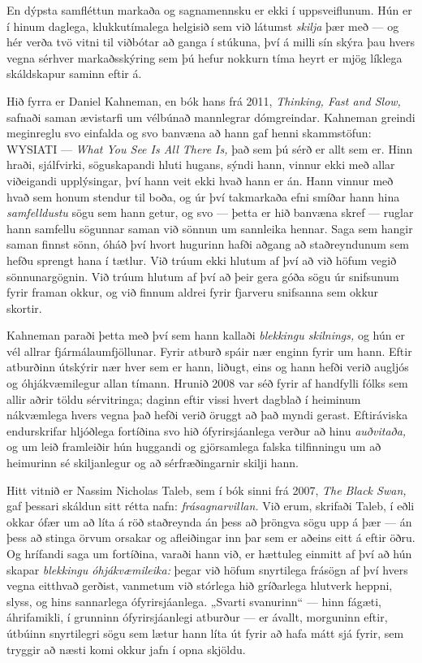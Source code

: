En dýpsta samfléttun markaða og sagnamennsku er ekki í uppsveiflunum. Hún er í hinum daglega, klukkutímalega helgisið sem við látumst \emph{skilja} þær með — og hér verða tvö vitni til viðbótar að ganga í stúkuna, því á milli sín skýra þau hvers vegna sérhver markaðsskýring sem þú hefur nokkurn tíma heyrt er mjög líklega skáldskapur saminn eftir á.

Hið fyrra er Daniel Kahneman, en bók hans frá 2011, \emph{Thinking, Fast and Slow,} safnaði saman ævistarfi um vélbúnað mannlegrar dómgreindar. Kahneman greindi meginreglu svo einfalda og svo banvæna að hann gaf henni skammstöfun: WYSIATI — \emph{What You See Is All There Is,} það sem þú sérð er allt sem er. Hinn hraði, sjálfvirki, söguskapandi hluti hugans, sýndi hann, vinnur ekki með allar viðeigandi upplýsingar, því hann veit ekki hvað hann er án. Hann vinnur með hvað sem honum stendur til boða, og úr því takmarkaða efni smíðar hann hina \emph{samfelldustu} sögu sem hann getur, og svo — þetta er hið banvæna skref — ruglar hann samfellu sögunnar saman við sönnun um sannleika hennar. Saga sem hangir saman finnst sönn, óháð því hvort hugurinn hafði aðgang að staðreyndunum sem hefðu sprengt hana í tætlur. Við trúum ekki hlutum af því að við höfum vegið sönnunargögnin. Við trúum hlutum af því að þeir gera góða sögu úr snifsunum fyrir framan okkur, og við finnum aldrei fyrir fjarveru snifsanna sem okkur skortir.

Kahneman paraði þetta með því sem hann kallaði \emph{blekkingu skilnings,} og hún er vél allrar fjármálaumfjöllunar. Fyrir atburð spáir nær enginn fyrir um hann. Eftir atburðinn útskýrir nær hver sem er hann, liðugt, eins og hann hefði verið augljós og óhjákvæmilegur allan tímann. Hrunið 2008 var séð fyrir af handfylli fólks sem allir aðrir töldu sérvitringa; daginn eftir vissi hvert dagblað í heiminum nákvæmlega hvers vegna það hefði verið öruggt að það myndi gerast. Eftiráviska endurskrifar hljóðlega fortíðina svo hið ófyrirsjáanlega verður að hinu \emph{auðvitaða,} og um leið framleiðir hún huggandi og gjörsamlega falska tilfinningu um að heimurinn sé skiljanlegur og að sérfræðingarnir skilji hann.

Hitt vitnið er Nassim Nicholas Taleb, sem í bók sinni frá 2007, \emph{The Black Swan,} gaf þessari skáldun sitt rétta nafn: \emph{frásagnarvillan.} Við erum, skrifaði Taleb, í eðli okkar ófær um að líta á röð staðreynda án þess að þröngva sögu upp á þær — án þess að stinga örvum orsakar og afleiðingar inn þar sem er aðeins eitt á eftir öðru. Og hrífandi saga um fortíðina, varaði hann við, er hættuleg einmitt af því að hún skapar \emph{blekkingu óhjákvæmileika:} þegar við höfum snyrtilega frásögn af því hvers vegna eitthvað gerðist, vanmetum við stórlega hið gríðarlega hlutverk heppni, slyss, og hins sannarlega ófyrirsjáanlega. „Svarti svanurinn“ — hinn fágæti, áhrifamikli, í grunninn ófyrirsjáanlegi atburður — er ávallt, morguninn eftir, útbúinn snyrtilegri sögu sem lætur hann líta út fyrir að hafa mátt sjá fyrir, sem tryggir að næsti komi okkur jafn í opna skjöldu.

